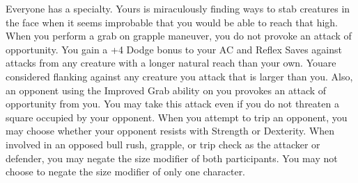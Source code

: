 \combatfeat
{Everyone has a specialty. Yours is miraculously finding ways to stab creatures in the face when it seems improbable that you would be able to reach that high.}
{When you perform a grab on grapple maneuver, you do not provoke an attack of opportunity.}
{You gain a +4 Dodge bonus to your AC and Reflex Saves against attacks from any creature with a longer natural reach than your own.}
{Youare considered flanking against any creature you attack that is larger than you. Also, an opponent using the Improved Grab ability on you provokes an attack of opportunity from you. You may take this attack even if you do not threaten a square occupied by your opponent.}
{When you attempt to trip an opponent, you may choose whether your opponent resists with Strength or Dexterity.}
{When involved in an opposed bull rush, grapple, or trip check as the attacker or defender, you may negate the size modifier of both participants. You may not choose to negate the size modifier of only one character.}